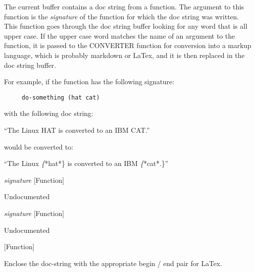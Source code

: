 \begin{doc-string}
The current buffer contains a doc string from a function.  The argument to this
function is the \emph{signature} of the function for which the doc string was written.
This function goes through the doc string buffer looking for any word that is all
upper case.  If the upper case word matches the name of an argument to the function,
it is passed to the CONVERTER function for conversion into a markup language, which
is probably markdown or LaTex, and it is then replaced in the doc string buffer.

For example, if the function has the following signature:

\small{\begin{verbatim}
     do-something (hat cat)
\end{verbatim}}

with the following doc string:

  ``The Linux HAT is converted to an IBM CAT.''

would be converted to:

  ``The Linux \emph\{*hat*\} is converted to an IBM \emph\{*cat*.\}''
\end{doc-string}

\vspace{1em}
\noindent
{}
\usebox{\funcname}\emph{signature}
 \hfill [Function]

\begin{doc-string}
Undocumented
\end{doc-string}

\vspace{1em}
\noindent
{}
\usebox{\funcname}\emph{signature}
 \hfill [Function]

\begin{doc-string}
Undocumented
\end{doc-string}

\vspace{1em}
\noindent
{}
\usebox{\funcname}
 \hfill [Function]

\begin{doc-string}
Enclose the doc-string with the appropriate begin / end pair for LaTex.
\end{doc-string}

